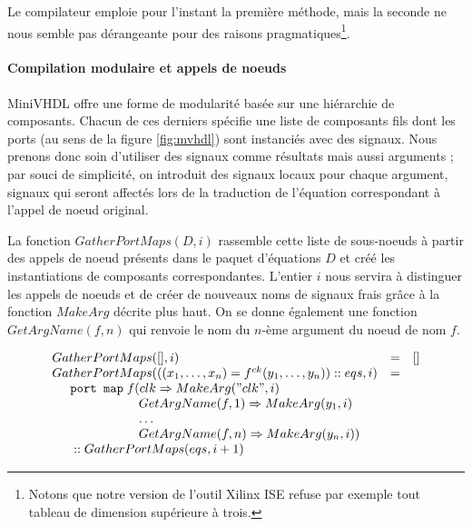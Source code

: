 \documentclass[a4paper]{article}
\newcommand{\mybox}[1]{\mbox{\tt{#1}}}
\newcommand{\ind}[0]{\hspace{0.5cm}}
\newcommand{\Cons}[0]{\; \mathbf{::} \;}
\newcommand{\App}[2]{#1^{ck}(#2)}
\begin{document}
Le compilateur emploie pour l'instant la premi\`ere m\'ethode, mais la seconde ne
nous semble pas d\'erangeante pour des raisons pragmatiques\footnote{Notons que
  notre version de l'outil Xilinx ISE refuse par exemple tout tableau de
  dimension sup\'erieure \`a trois.}.

\paragraph{Compilation modulaire et appels de noeuds}

MiniVHDL offre une forme de modularit\'e bas\'ee sur une hi\'erarchie de
composants. Chacun de ces derniers sp\'ecifie une liste de composants fils dont
les ports (au sens de la figure \ref{fig:mvhdl}) sont instanci\'es avec des
signaux. Nous prenons donc soin d'utiliser des signaux comme r\'esultats mais
aussi arguments ; par souci de simplicit\'e, on introduit des signaux locaux pour
chaque argument, signaux qui seront affect\'es lors de la traduction de l'\'equation
correspondant \`a l'appel de noeud original.

La fonction $GatherPortMaps(D, i)$ rassemble cette liste de sous-noeuds \`a partir
des appels de noeud pr\'esents dans le paquet d'\'equations $D$ et cr\'e\'e les
instantiations de composants correspondantes. L'entier $i$ nous servira \`a
distinguer les appels de noeuds et de cr\'eer de nouveaux noms de signaux frais
gr\^ace \`a la fonction $MakeArg$ d\'ecrite plus haut. On se donne \'egalement une
fonction $GetArgName(f,n)$ qui renvoie le nom du $n$-\`eme argument du noeud de
nom $f$.

\newcommand{\GPM}[2]{GatherPortMaps(#1,#2)}
\newcommand{\GAN}[2]{GetArgName(#1,#2)}

\[
\begin{array}{lcl}
  \GPM{[]}{i} & = & [] \\
  \GPM{((x_1,\dots,x_n) = \App{f}{y_1,\dots,y_n}) \Cons eqs}{i} & = &
  \\
  \ind \mybox{port map} \; f ( clk \Rightarrow \MA{"clk"}{i} \\
  \ind \ind \ind \ind \hspace{0.4cm} \GAN{f}{1} \Rightarrow \MA{y_1}{i} \\
  \ind \ind \ind \ind \hspace{0.4cm} \dots \\
  \ind \ind \ind \ind \hspace{0.4cm} \GAN{f}{n} \Rightarrow \MA{y_n}{i}) \\
  \ind \Cons \GPM{eqs}{i + 1}
\end{array}
\]
\end{document}
